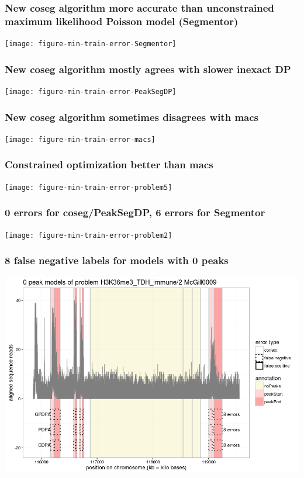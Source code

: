 \documentclass{beamer}
\begin{document}
\begin{frame}
  \frametitle{New coseg algorithm more accurate than unconstrained
    maximum likelihood Poisson model (Segmentor)}
  \texttt{[image: figure-min-train-error-Segmentor]}
\end{frame}

\begin{frame}
  \frametitle{New coseg algorithm mostly agrees with slower inexact DP}
  \texttt{[image: figure-min-train-error-PeakSegDP]}
\end{frame}

\begin{frame}
  \frametitle{New coseg algorithm sometimes disagrees with macs}
  \texttt{[image: figure-min-train-error-macs]}
\end{frame}

\begin{frame}
  \frametitle{Constrained optimization better than macs}
  \texttt{[image: figure-min-train-error-problem5]}
\end{frame}

\begin{frame}
  \frametitle{0 errors for coseg/PeakSegDP, 6 errors for Segmentor}
  \texttt{[image: figure-min-train-error-problem2]}
\end{frame}

\begin{frame}
  \frametitle{8 false negative labels for models with 0 peaks}
  \includegraphics[width=\textwidth]{figure-min-train-error-problem5-0peaks}
\end{frame}
\end{document}
